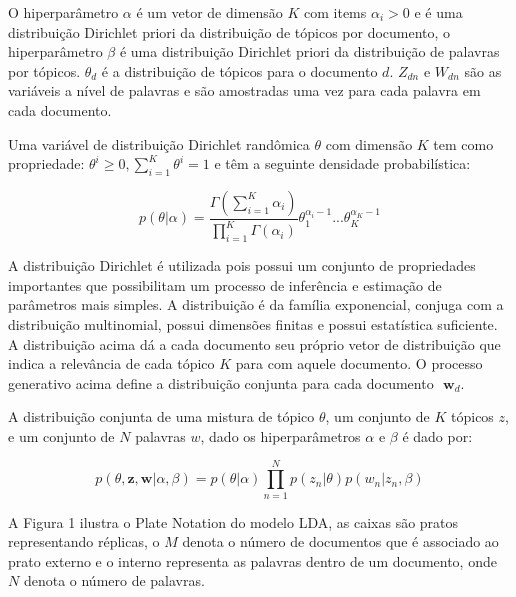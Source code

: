 \documentclass[12pt,a4paper]{article}
\begin{document}
  O  hiperparâmetro $\alpha$ é um vetor de dimensão $K$ com items \(\alpha _i>0\) e é uma distribuição Dirichlet priori da distribuição de tópicos por documento, o hiperparâmetro $\beta$ é uma distribuição Dirichlet priori da distribuição de palavras por tópicos. $\theta _d$ é a distribuição de tópicos para o documento $d$. $Z_{dn}$ e $W_{dn}$ são as variáveis a nível de palavras e são amostradas uma vez para cada palavra em cada documento.
  
  Uma variável de distribuição Dirichlet randômica $\theta$ com dimensão $K$ tem como propriedade: $\theta ^i \geq 0, \displaystyle\sum_{i=1}^{K} \theta ^i = 1$ e têm a seguinte densidade probabilística:
  
  \begin{equation}
  p(\theta|\alpha) = \frac{\Gamma(\displaystyle\sum_{i=1}^{K} \alpha _i)}{\displaystyle\prod_{i=1}^{K} \Gamma(\alpha _i)} \theta _1 ^{\alpha _i - 1} ...  \theta _K ^{\alpha _K - 1}
  \end{equation}
  
  A distribuição Dirichlet é utilizada pois possui um conjunto de propriedades importantes que possibilitam um processo de inferência e estimação de parâmetros mais simples. A distribuição é da família exponencial, conjuga com a distribuição multinomial, possui dimensões finitas e possui estatística suficiente. A distribuição  acima dá a cada documento seu próprio vetor de distribuição que indica a relevância de cada tópico $K$ para com aquele documento. O processo generativo acima define a distribuição conjunta para cada documento $\textbf{ w}_d$.
  
  A distribuição conjunta de uma mistura de tópico $\theta$, um conjunto de $K$ tópicos $z$, e um conjunto de $N$ palavras $w$, dado os hiperparâmetros $\alpha$ e $\beta$ é dado por:
  
  
  \begin{equation}
  p(\theta,\textbf{z},\textbf{w}|\alpha,\beta) = p(\theta|\alpha) \prod_{n=1}^{N} p(z_n|\theta)p(w_n|z_n,\beta)
  \end{equation}
  
  
  A Figura 1 ilustra o Plate Notation do modelo LDA, as caixas são pratos representando réplicas, o $M$ denota o número de documentos que é associado ao prato externo e o interno representa as palavras dentro de um documento, onde $N$ denota o número de palavras.
  
\end{document}

